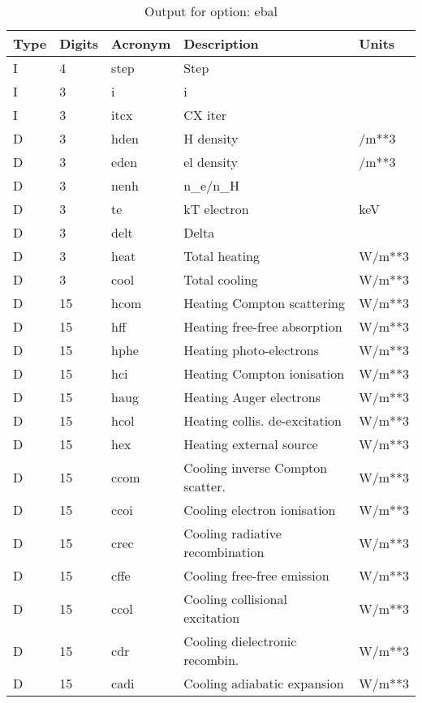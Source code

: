 \begin{table}[!p]
\caption{Output for option: ebal}
\label{tabout:ebal}
\begin{tabular}{lllll}
\hline
Type & Digits & Acronym & Description & Units \\ 
\hline
I &  4 & step & Step                             &                  \\
I &  3 & i    & i                                &                  \\
I &  3 & itcx & CX iter                          &                  \\
D &  3 & hden & H density                        & /m**3            \\
D &  3 & eden & el density                       & /m**3            \\
D &  3 & nenh & n_e/n_H                          &                  \\
D &  3 & te   & kT electron                      & keV              \\
D &  3 & delt & Delta                            &                  \\
D &  3 & heat & Total heating                    & W/m**3           \\
D &  3 & cool & Total cooling                    & W/m**3           \\
D & 15 & hcom & Heating Compton scattering       & W/m**3           \\
D & 15 & hff  & Heating free-free absorption     & W/m**3           \\
D & 15 & hphe & Heating photo-electrons          & W/m**3           \\
D & 15 & hci  & Heating Compton ionisation       & W/m**3           \\
D & 15 & haug & Heating Auger electrons          & W/m**3           \\
D & 15 & hcol & Heating collis. de-excitation    & W/m**3           \\
D & 15 & hex  & Heating external source          & W/m**3           \\
D & 15 & ccom & Cooling inverse Compton scatter. & W/m**3           \\
D & 15 & ccoi & Cooling electron ionisation      & W/m**3           \\
D & 15 & crec & Cooling radiative recombination  & W/m**3           \\
D & 15 & cffe & Cooling free-free emission       & W/m**3           \\
D & 15 & ccol & Cooling collisional excitation   & W/m**3           \\
D & 15 & cdr  & Cooling dielectronic recombin.   & W/m**3           \\
D & 15 & cadi & Cooling adiabatic expansion      & W/m**3           \\
\hline
\end{tabular}
\end{table}


